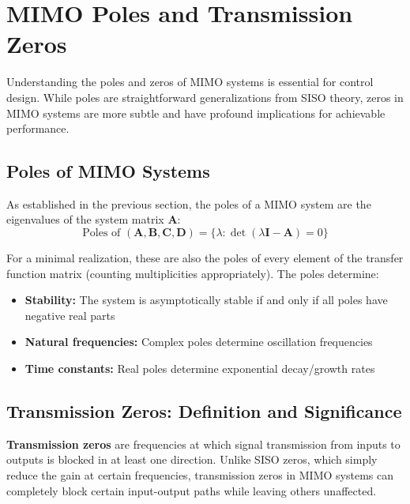 \section{MIMO Poles and Transmission Zeros}
\label{sec:mimo_poles_zeros}

Understanding the poles and zeros of MIMO systems is essential for control design. While poles are straightforward generalizations from SISO theory, zeros in MIMO systems are more subtle and have profound implications for achievable performance.

\subsection{Poles of MIMO Systems}

As established in the previous section, the poles of a MIMO system are the eigenvalues of the system matrix $\mathbf{A}$:
\begin{equation}
\text{Poles of } (\mathbf{A}, \mathbf{B}, \mathbf{C}, \mathbf{D}) = \{\lambda : \det(\lambda\mathbf{I} - \mathbf{A}) = 0\}
\end{equation}

For a minimal realization, these are also the poles of every element of the transfer function matrix (counting multiplicities appropriately). The poles determine:

\begin{itemize}
\item \textbf{Stability:} The system is asymptotically stable if and only if all poles have negative real parts
\item \textbf{Natural frequencies:} Complex poles determine oscillation frequencies
\item \textbf{Time constants:} Real poles determine exponential decay/growth rates
\end{itemize}

\subsection{Transmission Zeros: Definition and Significance}

\textbf{Transmission zeros} are frequencies at which signal transmission from inputs to outputs is blocked in at least one direction. Unlike SISO zeros, which simply reduce the gain at certain frequencies, transmission zeros in MIMO systems can completely block certain input-output paths while leaving others unaffected.

